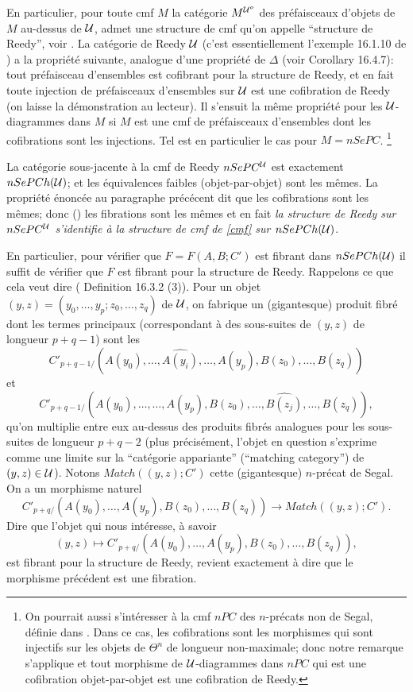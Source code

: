 \documentclass[12pt]{article}
\newcommand{\Uu}{{\cal U}}
\begin{document}
En particulier, pour toute cmf $M$ la cat\'egorie $M^{\Uu
^o}$ des pr\'efaisceaux d'objets de $M$ au-dessus de $\Uu$, admet une
structure de
cmf qu'on appelle ``structure de Reedy'', voir \cite{Hirschhorn}.  La
cat\'egorie de Reedy $\Uu$ (c'est essentiellement l'exemple 16.1.10 de
\cite{Hirschhorn}) a la propri\'et\'e suivante, analogue d'une
propri\'et\'e de $\Delta$ (voir \cite{Hirschhorn} Corollary 16.4.7):
tout
pr\'efaisceau d'ensembles est cofibrant pour la structure de Reedy, et en fait
toute injection de pr\'efaisceaux d'ensembles sur $\Uu$ est une cofibration de
Reedy (on laisse la d\'emonstration au lecteur). Il s'ensuit la m\^eme
propri\'et\'e pour les $\Uu$-diagrammes dans $M$ si $M$ est une cmf de
pr\'efaisceaux d'ensembles dont les cofibrations sont les injections.
Tel est en particulier le cas pour $M=nSePC$.  \footnote{
On pourrait aussi s'int\'eresser \`a la cmf $nPC$ des $n$-pr\'ecats non de
Segal,
d\'efinie dans \cite{nCAT}.
Dans ce cas, les cofibrations sont les morphismes qui sont
injectifs sur les objets de $\Theta ^ n$ de longueur non-maximale; donc notre
remarque s'applique et tout morphisme de $\Uu$-diagrammes dans $nPC$ qui est
une cofibration objet-par-objet est une cofibration de Reedy.}

La cat\'egorie sous-jacente \`a la cmf de Reedy $nSePC^{\Uu}$ est
exactement
$nSePCh(\Uu )$; et les \'equivalences faibles (objet-par-objet) sont les
m\^emes. La propri\'et\'e \'enonc\'ee au paragraphe pr\'ec\'ecent
dit que les cofibrations sont les m\^emes; donc (\cite{Quillen}) les fibrations
sont les m\^emes et en fait {\em la structure de Reedy sur $nSePC^{\Uu}$
s'identifie \`a la structure de cmf de \ref{cmf} sur $nSePCh(\Uu )$}.

En particulier, pour v\'erifier que $F=F(A,B; C')$ est fibrant
dans $nSePCh(\Uu )$
il suffit de v\'erifier que $F$ est fibrant pour la structure de Reedy.
Rappelons ce que cela veut dire (\cite{Hirschhorn} Definition 16.3.2 (3)).
Pour un objet $(y,z)= (y_0,\ldots , y_p; z_0,\ldots , z_q)$ de $\Uu$,
on fabrique un (gigantesque) produit fibr\'e dont les termes principaux
(correspondant \`a des sous-suites de $(y,z)$ de longueur $p+q-1$)
sont les
$$
C'_{p+q-1/}(A(y_0),\ldots , \widehat{A(y_i)},\ldots , A(y_p),
B(z_0),\ldots , B(z_q))
$$
et
$$
C'_{p+q-1/}(A(y_0),\ldots , \ldots , A(y_p),
B(z_0),\ldots ,\widehat{B(z_j)},\ldots , B(z_q)),
$$
qu'on multiplie entre eux
au-dessus des produits fibr\'es analogues pour les
sous-suites de longueur $p+q-2$ (plus pr\'ecis\'ement, l'objet en question
s'exprime comme une limite sur la ``cat\'egorie appariante''
(``matching
category'') de $(y,z)\in \Uu $). Notons $Match((y,z); C')$
cette (gigantesque) $n$-pr\'ecat de Segal. On a un morphisme naturel
$$
C'_{p+q/}(A(y_0),\ldots ,  A(y_p),
B(z_0),\ldots , B(z_q))\rightarrow
Match ((y,z); C').
$$
Dire que l'objet qui nous int\'eresse, \`a savoir
$$
(y,z)\mapsto C'_{p+q/}(A(y_0),\ldots ,  A(y_p),
B(z_0),\ldots , B(z_q)),
$$
est fibrant pour la structure de Reedy,
revient exactement \`a dire que le
morphisme pr\'ec\'edent est une fibration.
\end{document}
